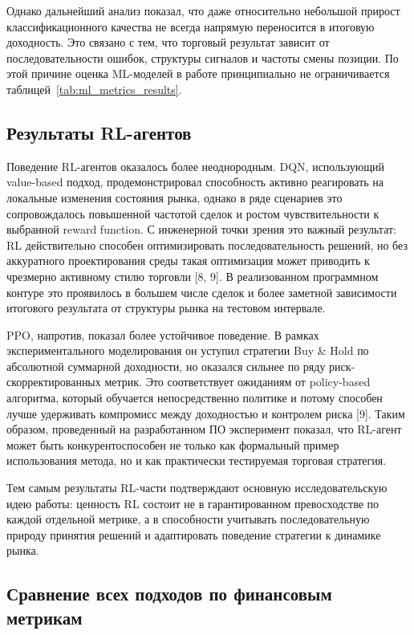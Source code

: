 Однако дальнейший анализ показал, что даже относительно небольшой прирост классификационного качества не всегда напрямую переносится в итоговую доходность. Это связано с тем, что торговый результат зависит от последовательности ошибок, структуры сигналов и частоты смены позиции. По этой причине оценка ML-моделей в работе принципиально не ограничивается таблицей~\ref{tab:ml_metrics_results}.

\subsection{Результаты RL-агентов}

Поведение RL-агентов оказалось более неоднородным. DQN, использующий value-based подход, продемонстрировал способность активно реагировать на локальные изменения состояния рынка, однако в ряде сценариев это сопровождалось повышенной частотой сделок и ростом чувствительности к выбранной reward function. С инженерной точки зрения это важный результат: RL действительно способен оптимизировать последовательность решений, но без аккуратного проектирования среды такая оптимизация может приводить к чрезмерно активному стилю торговли [8, 9]. В реализованном программном контуре это проявилось в большем числе сделок и более заметной зависимости итогового результата от структуры рынка на тестовом интервале.

PPO, напротив, показал более устойчивое поведение. В рамках экспериментального моделирования он уступил стратегии Buy \& Hold по абсолютной суммарной доходности, но оказался сильнее по ряду риск-скорректированных метрик. Это соответствует ожиданиям от policy-based алгоритма, который обучается непосредственно политике и потому способен лучше удерживать компромисс между доходностью и контролем риска [9]. Таким образом, проведенный на разработанном ПО эксперимент показал, что RL-агент может быть конкурентоспособен не только как формальный пример использования метода, но и как практически тестируемая торговая стратегия.

Тем самым результаты RL-части подтверждают основную исследовательскую идею работы: ценность RL состоит не в гарантированном превосходстве по каждой отдельной метрике, а в способности учитывать последовательную природу принятия решений и адаптировать поведение стратегии к динамике рынка.

\subsection{Сравнение всех подходов по финансовым метрикам}

